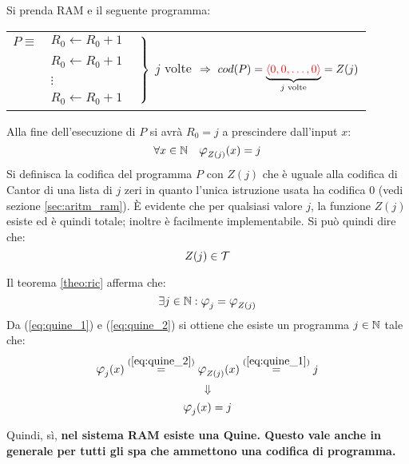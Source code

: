 Si prenda RAM e il seguente programma:

\begin{center}
    \begin{tabular}{r l l}
        $P\equiv$ & $R_0 \leftarrow R_0+1$  & 
        \multirow{4}{*}{\hspace{-1em}
            $\begin{rcases}
                \phantom{}\\
                \phantom{}\\
                \phantom{\vdots}\\
                \phantom{}\\
            \end{rcases}$ $j$ volte $\ \Rightarrow \ cod(P)=
            \underbrace{\color{red}\langle0,0,\dots,0\rangle}_{\text{$j$ volte}}
            = Z(j)$
        }\\
        & $R_0 \leftarrow R_0+1$  \\ 
        & \hspace{2em}$\vdots$    \\
        & $R_0 \leftarrow R_0+1$  \\                     
    \end{tabular}
\end{center}

Alla fine dell'esecuzione di $P$ si avrà $R_0=j$ a prescindere dall'input $x$:
\begin{equation}\label{eq:quine_1}
    \forall x\in\N \quad \semRAM_{Z(j)}(x) = j
\end{equation}
Si definisca la {\color{red}codifica del programma $P$} con $Z(j)$ che è uguale
alla codifica di Cantor di una lista di $j$ zeri in quanto l'unica istruzione usata
ha codifica 0 (vedi sezione \ref{sec:aritm_ram}). 
È evidente che per qualsiasi valore $j$, la funzione $Z(j)$ esiste ed è quindi totale;
inoltre è facilmente implementabile. Si può quindi dire che:
$$Z(j)\in\mathcal{T}$$

Il teorema \ref{theo:ric} afferma che:
\begin{equation}\label{eq:quine_2}
    \exists j\in\N:\semRAM_j = \semRAM_{Z(j)}
\end{equation} 
Da (\ref{eq:quine_1}) e (\ref{eq:quine_2}) si ottiene che esiste un programma $j\in\mathbb{N}$
tale che:
$$ \semRAM_j(x) \overset{(\ref{eq:quine_2})}{=} \semRAM_{Z(j)}(x)
\overset{(\ref{eq:quine_1})}{=} j $$
$$\Downarrow$$
$$ \semRAM_j(x) = j $$

Quindi, sì,\textbf{ nel sistema RAM esiste una Quine. Questo vale anche in generale
per tutti gli spa che ammettono una codifica di programma.}

